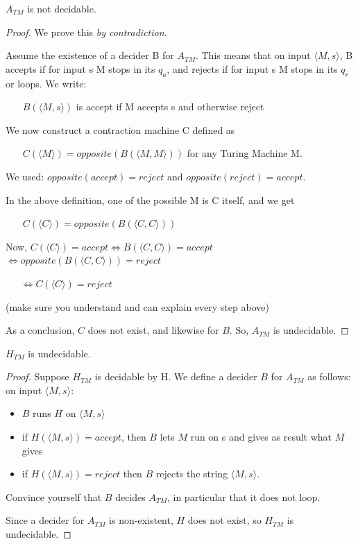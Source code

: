 \begin{theorem}
$A_{TM}$ is not decidable.
\end{theorem}
\begin{proof}
We prove this {\em by contradiction}.


Assume the existence of a decider B for $A_{TM}$. This means that on
input $\langle M,s \rangle$, B accepts if for input s M stops in its
$q_a$, and rejects if for input s M stops in its $q_r$ or loops. We
write:

$~~~~~~~~B(\langle M,s \rangle)$ is accept if M accepts s and otherwise reject

We now construct a contraction machine C defined as

$~~~~~~~~C(\langle M \rangle) = opposite(B(\langle M,M \rangle))$ for
any Turing Machine M.

We used:
$opposite(accept) = reject$ and $opposite(reject) = accept$.


In the above definition, one of the possible M is C itself, and we get


$~~~~~~~~C(\langle C \rangle) = opposite(B(\langle C,C \rangle))$


Now,  $C(\langle C \rangle) = accept \Leftrightarrow B(\langle C,C \rangle)
= accept$
%
$ \Leftrightarrow opposite(B(\langle C,C \rangle)) = reject$

$~~~~~~~ \Leftrightarrow C(\langle C \rangle) = reject$

(make sure you understand and can explain every step above)

As a conclusion, $C$ does not exist, and likewise for $B$. So,
$A_{TM}$ is undecidable.
\end{proof}

\begin{theorem}
$H_{TM}$ is undecidable.
\end{theorem}
\begin{proof}
Suppose $H_{TM}$ is decidable by H. We define a decider $B$ for
$A_{TM}$ as follows: on input $\langle M,s \rangle$:
\begin{itemize}
\item $B$ runs $H$ on $\langle M,s \rangle$
\item if $H(\langle M,s \rangle) = accept$, then $B$ lets $M$ run on s
  and gives as result what $M$ gives
\item if $H(\langle M,s \rangle) = reject$ then $B$ rejects the string
  $\langle M,s \rangle$.
\end{itemize}
Convince yourself that $B$ decides $A_{TM}$, in particular that it
does not loop.

Since a decider for $A_{TM}$ is non-existent, $H$ does not exist, so
$H_{TM}$ is undecidable.
\end{proof}

